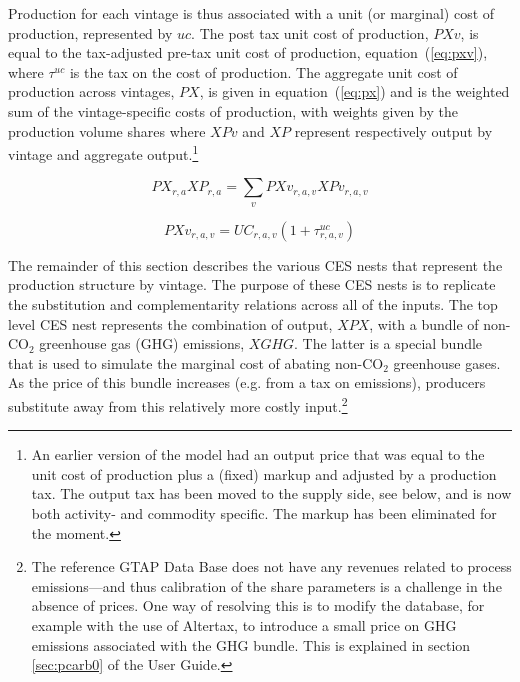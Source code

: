 \documentclass[11pt,letterpaper]{report}
\begin{document}
Production for each vintage is thus associated with a unit (or marginal) cost of
production, represented by $\mathit{uc}$. The post tax unit cost of production,
$\mathit{PXv}$, is equal to the tax-adjusted pre-tax unit cost of production,
equation~(\ref{eq:pxv}), where $\tau^{\mathit{uc}}$ is the tax on the cost of
production. The aggregate unit cost of production across vintages,
$\mathit{PX}$, is given in equation~(\ref{eq:px}) and is the weighted sum of the
vintage-specific costs of production, with weights given by the production
volume shares where $\mathit{XPv}$ and $XP$ represent respectively output by
vintage and aggregate output.\footnote{An earlier version of the model had an
output price that was equal to the unit cost of production plus a (fixed) markup
and adjusted by a production tax. The output tax has been moved to the supply
side, see below, and is now both activity- and commodity specific. The markup
has been eliminated for the moment.}

\begin{equation}
\label{eq:px}
\mathit{PX}_{r,a} \mathit{XP}_{r,a} =
   \sum_v {
      \mathit{PXv}_{r,a,v} \mathit{XPv}_{r,a,v}
   }
\end{equation}

\begin{equation}
\label{eq:pxv}
\mathit{PXv}_{r,a,v} =
   \mathit{UC}_{r,a,v} \left( 1+\tau^{\mathit{uc}}_{r,a,v} \right)
\end{equation}

The remainder of this section describes the various CES nests that represent the
production structure by vintage. The purpose of these CES nests is to replicate
the substitution and complementarity relations across all of the inputs. The top
level CES nest represents the combination of output, $\mathit{XPX}$, with a
bundle of non-CO$_2$ greenhouse gas (GHG) emissions, $\mathit{XGHG}$. The latter
is a special bundle that is used to simulate the marginal cost of abating
non-CO$_2$ greenhouse gases. As the price of this bundle increases (e.g. from a
tax on emissions), producers substitute away from this relatively more costly
input.\footnote{The reference GTAP Data Base does not have any
revenues related to process emissions---and thus calibration of the
share parameters is a challenge in the absence of prices. One
way of resolving this is to modify the database, for example with
the use of Altertax, to introduce a small price on GHG
emissions associated with the GHG bundle. This is explained
in section \ref{sec:pcarb0} of the User Guide.}
\end{document}
